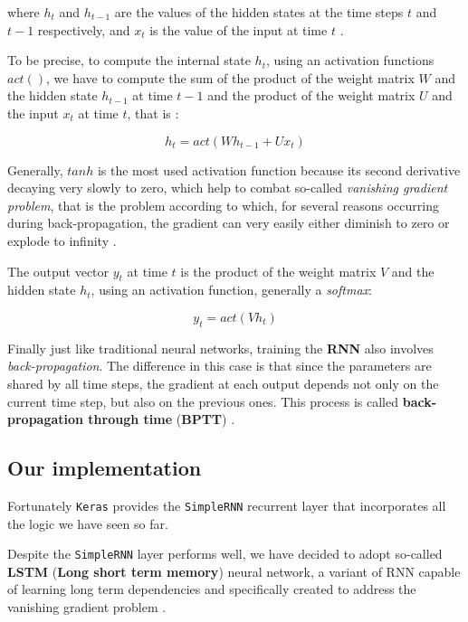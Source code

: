 \documentclass[sigconf]{acmart}
\begin{document}
where $h_t$ and $h_{t-1}$ are the values of the hidden states at the time steps $t$ and $t-1$ respectively, and $x_t$ is the
value of the input at time $t$ \cite{DeepKeras}.

To be precise, to compute the internal state $h_t$, using an activation functions $act()$, we have to compute the sum of the product of the weight matrix $W$ and the hidden state $h_{t-1}$ at time $t-1$ and the product of the weight matrix $U$ and the input $x_t$ at time $t$, that is \cite{DeepKeras}\cite{FalessiDataMining}:

\begin{equation}
h_t = act(Wh_{t-1} + Ux_t)
\end{equation}

Generally, $tanh$ is the most used activation function because its second derivative decaying very slowly to zero, which help to combat so-called \textit{vanishing gradient problem}, that is the problem according to which, for several reasons occurring during back-propagation, the gradient can very easily either diminish to zero or explode to infinity \cite{DeepKeras}\cite{FalessiDataMining}\cite{NILMOTHER}.  

The output vector $y_t$ at time $t$ is the product of the weight matrix $V$ and the hidden state $h_t$, using an activation function, generally a \textit{softmax}\cite{DeepKeras}\cite{FalessiDataMining}:

\begin{equation}
y_t = act(Vh_t)
\end{equation}

Finally just like traditional neural networks, training the \textbf{RNN} also involves \textit{back-propagation}. The difference in this case is that since the parameters are shared by all time steps, the gradient at each output depends not only on the current time step, but also on the previous ones. This process is called \textbf{back-propagation through time} (\textbf{BPTT}) \cite{NILMOTHER}\cite{DeepKeras}. 

\subsection{Our implementation}

Fortunately \texttt{Keras} provides the \texttt{SimpleRNN} recurrent layer that incorporates all the logic we have seen so far. 

Despite the \texttt{SimpleRNN} layer performs well, we have decided to adopt so-called \textbf{LSTM} (\textbf{Long short term memory}) neural network, a variant of RNN capable of learning long term dependencies and specifically created to address the vanishing gradient problem \cite{DeepKeras}\cite{FalessiDataMining}\cite{NILMOTHER}. 
\end{document}
